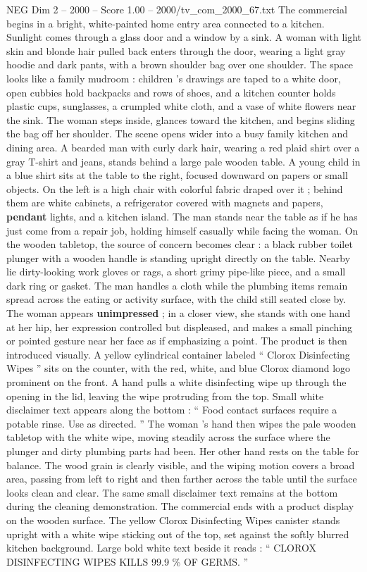 \begin{textsample}{NEG Dim 2 – 2000 – Score 1.00 – 2000/tv\_com\_2000\_67.txt}  \label{ex:f2_neg_077}
The commercial begins in a bright, white-painted home entry area connected to a kitchen.
Sunlight comes through a glass door and a window by a sink.
A woman with light skin and blonde hair pulled back enters through the door, wearing a light gray hoodie and dark pants, with a brown shoulder bag over one shoulder.
The space looks like a family mudroom : children ’s drawings are taped to a white door, open cubbies hold backpacks and rows of shoes, and a kitchen counter holds plastic cups, sunglasses, a crumpled white cloth, and a vase of white flowers near the sink.
The woman steps inside, glances toward the kitchen, and begins sliding the bag off her shoulder.
The scene opens wider into a busy family kitchen and dining area.
A bearded man with curly dark hair, wearing a red plaid shirt over a gray T-shirt and jeans, stands behind a large pale wooden table.
A young child in a blue shirt sits at the table to the right, focused downward on papers or small objects.
On the left is a high chair with colorful fabric draped over it ; behind them are white cabinets, a refrigerator covered with magnets and papers, \textbf{pendant} lights, and a kitchen island.
The man stands near the table as if he has just come from a repair job, holding himself casually while facing the woman.
On the wooden tabletop, the source of concern becomes clear : a black rubber toilet plunger with a wooden handle is standing upright directly on the table.
Nearby lie dirty-looking work gloves or rags, a short grimy pipe-like piece, and a small dark ring or gasket.
The man handles a cloth while the plumbing items remain spread across the eating or activity surface, with the child still seated close by.
The woman appears \textbf{unimpressed} ; in a closer view, she stands with one hand at her hip, her expression controlled but displeased, and makes a small pinching or pointed gesture near her face as if emphasizing a point.
The product is then introduced visually.
A yellow cylindrical container labeled “ Clorox Disinfecting Wipes ” sits on the counter, with the red, white, and blue Clorox diamond logo prominent on the front.
A hand pulls a white disinfecting wipe up through the opening in the lid, leaving the wipe protruding from the top.
Small white disclaimer text appears along the bottom : “ Food contact surfaces require a potable rinse.
Use as directed. ” The woman ’s hand then wipes the pale wooden tabletop with the white wipe, moving steadily across the surface where the plunger and dirty plumbing parts had been.
Her other hand rests on the table for balance.
The wood grain is clearly visible, and the wiping motion covers a broad area, passing from left to right and then farther across the table until the surface looks clean and clear.
The same small disclaimer text remains at the bottom during the cleaning demonstration.
The commercial ends with a product display on the wooden surface.
The yellow Clorox Disinfecting Wipes canister stands upright with a white wipe sticking out of the top, set against the softly blurred kitchen background.
Large bold white text beside it reads : “ CLOROX DISINFECTING WIPES KILLS 99.9 \% OF GERMS. ”

\end{textsample}
